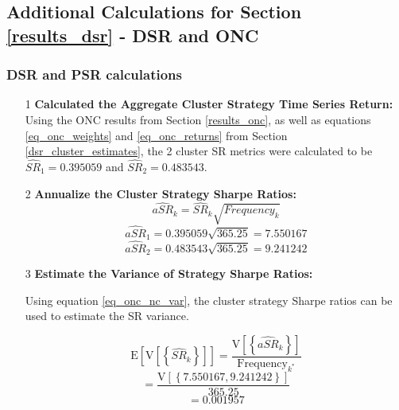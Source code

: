 \documentclass[a4paper,11pt,oneside]{article}
\theoremstyle{plain}
\theoremstyle{definition}
\begin{document}
	
	
	
	
	
	
	
	\subsection{Additional Calculations for Section \ref{results_dsr} - DSR and ONC}\label{results_dsr_appendix}
	
	
	\subsubsection{DSR and PSR calculations}
	
	\begin{itemize}
		\item [1] \textbf{Calculated the Aggregate Cluster Strategy Time Series Return:} \newline
		Using the ONC results from Section \ref{results_onc}, as well as equations \ref{eq_onc_weights} and \ref{eq_onc_returns} from Section \ref{dsr_cluster_estimates}, the 2 cluster SR metrics were calculated to be $\widehat{SR}_{1}={0.395059}$ and 	$\widehat{SR}_{2}={0.483543}$. \newline
		
		\item [2] \textbf{Annualize the Cluster Strategy Sharpe Ratios:} \newline
		\begin{equation}
		\widehat{aSR}_{k}=\widehat{SR}_{k}\sqrt{{Frequency_{k}}}
		\end{equation}
		\begin{equation}
		\widehat{aSR}_{1}={0.395059}\sqrt{{365.25}}={7.550167}
		\end{equation}
		\begin{equation}
		\widehat{aSR}_{2}={0.483543}\sqrt{{365.25}} ={9.241242}
		\end{equation}

		\item [3] \textbf{Estimate the Variance of Strategy Sharpe Ratios:} \newline

		Using equation \eqref{eq_onc_nc_var}, the cluster strategy Sharpe ratios can be used to estimate the SR variance. 
		
		\begin{equation}
		\mathrm{E}\left[\mathrm{V}\left[\left\{\widehat{S R}_{k}\right\}\right]\right]=\frac{\mathrm{V}\left[\left\{\widehat{aSR}_{k}\right\}\right]}{\text {Frequency}_{k^{*}}}
		\end{equation}
		\begin{equation}
		=\frac{\mathrm{V}\left[\left\{{7.550167,9.241242} \right\}\right]}{\text {365.25}}
		\end{equation}
		\begin{equation}
		={0.001957}
		\end{equation}
		

\end{itemize}
\end{document}
